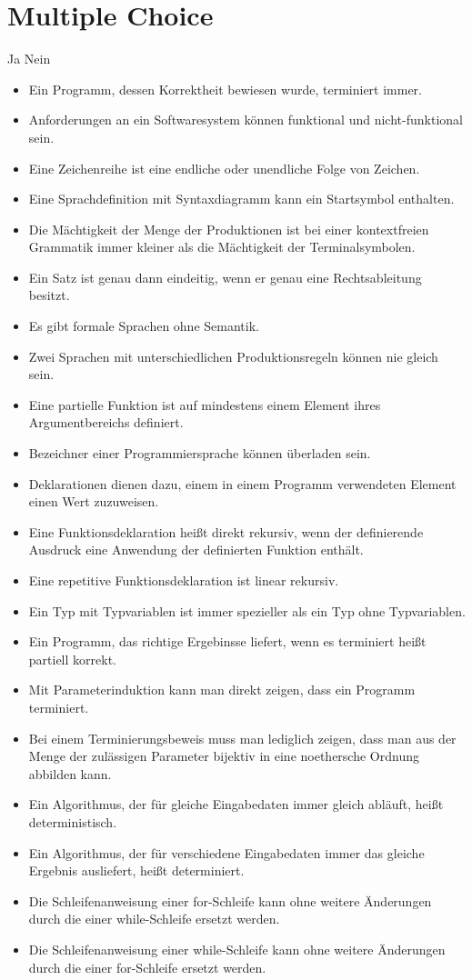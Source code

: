 \documentclass[11pt,a4paper,oneside,ngerman]{scrbook}
\begin{document}
\section{Multiple Choice}
Ja Nein
\begin{itemize}[label={\Square \ \Square}]
  \item Ein Programm, dessen Korrektheit bewiesen wurde, terminiert immer. %
  \item Anforderungen an ein Softwaresystem können funktional und nicht-funktional sein. %
  \item Eine Zeichenreihe ist eine endliche oder unendliche Folge von Zeichen. %
  \item Eine Sprachdefinition mit Syntaxdiagramm kann ein Startsymbol enthalten. %
  \item Die Mächtigkeit der Menge der Produktionen ist bei einer kontextfreien Grammatik immer kleiner als die Mächtigkeit der Terminalsymbolen. %
  \item Ein Satz ist genau dann eindeitig, wenn er genau eine Rechtsableitung besitzt. %
  \item Es gibt formale Sprachen ohne Semantik. %
  \item Zwei Sprachen mit unterschiedlichen Produktionsregeln können nie gleich sein. %
  \item Eine partielle Funktion ist auf mindestens einem Element ihres Argumentbereichs definiert. %
  \item Bezeichner einer Programmiersprache können überladen sein. %
  \item Deklarationen dienen dazu, einem in einem Programm verwendeten Element einen Wert zuzuweisen. %
  \item Eine Funktionsdeklaration heißt direkt rekursiv, wenn der definierende Ausdruck eine Anwendung der definierten Funktion enthält. %
  \item Eine repetitive Funktionsdeklaration ist linear rekursiv. %
  \item Ein Typ mit Typvariablen ist immer spezieller als ein Typ ohne Typvariablen. %
  \item Ein Programm, das richtige Ergebinsse liefert, wenn es terminiert heißt partiell korrekt. %
  \item Mit Parameterinduktion kann man direkt zeigen, dass ein Programm terminiert. %
  \item Bei einem Terminierungsbeweis muss man lediglich zeigen, dass man aus der Menge der zulässigen Parameter bijektiv in eine noethersche Ordnung abbilden kann. %
  \item Ein Algorithmus, der für gleiche Eingabedaten immer gleich abläuft, heißt deterministisch. %
  \item Ein Algorithmus, der für verschiedene Eingabedaten immer das gleiche Ergebnis ausliefert, heißt determiniert. %
  \item Die Schleifenanweisung einer for-Schleife kann ohne weitere Änderungen durch die einer while-Schleife ersetzt werden. %
  \item Die Schleifenanweisung einer while-Schleife kann ohne weitere Änderungen durch die einer for-Schleife ersetzt werden. %
  

\end{itemize}
\end{document}
